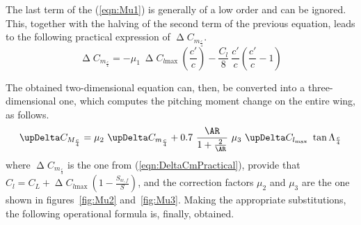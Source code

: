 The last term of the (\ref{eqn:Mu1}) is generally of a low order and can be ignored. This, together with the halving of the second term of the previous equation, leads to the following practical expression of $\upDelta C_{m_{\frac{c}{4}}}$.
%
\begin{equation}
\upDelta C_{m_{\frac{c}{4}}}=-\mu_1\ \upDelta C_{l\text{max}}\ \left(\dfrac{c'}{c}\right)-\dfrac{C_l}{8}\ \dfrac{c'}{c}\left(\dfrac{c'}{c}-1\right)
\label{eqn:DeltaCmPractical}
\end{equation}

\bigskip
\noindent
The obtained two-dimensional equation can, then, be converted into a three-dimensional one, which computes the pitching moment change on the entire wing, as follows.
%
\begin{equation}
\upDelta C_{M_{\frac{c}{4}}}=\mu_2\ \upDelta C_{m_{\frac{c}{4}}}+0.7\ \dfrac{\AR}{1+\frac{2}{\AR}}\ \mu_3\ \upDelta C_{l_{\text{max}}}\ \tan\Lambda_{\frac{c}{4}}
\label{eqn:DeltaCM}
\end{equation}
%
where $\upDelta C_{m_{\frac{c}{4}}}$ is the one from (\ref{eqn:DeltaCmPractical}), provide that $C_l=C_L+\upDelta C_{l\text{max}}\ \left(1-\frac{S_{w,f}}{S}\right)$, and the correction factors $\mu_2$ and $\mu_3$ are the one shown in figures~\ref{fig:Mu2} and~\ref{fig:Mu3}. Making the appropriate substitutions, the following operational formula is, finally, obtained.
%

